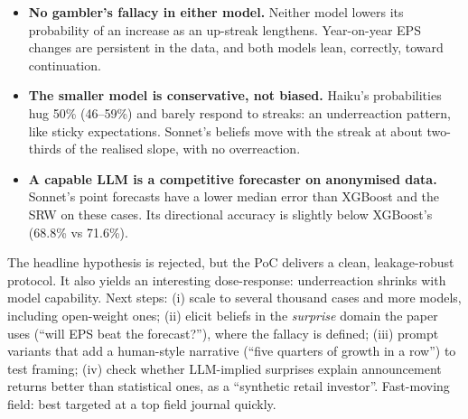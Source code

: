 \begin{itemize}
\item \textbf{No gambler's fallacy in either model.} Neither model lowers its probability of an increase as an
  up-streak lengthens. Year-on-year EPS changes are persistent in the data, and both models lean, correctly, toward
  continuation.
\item \textbf{The smaller model is conservative, not biased.} Haiku's probabilities hug 50\% (46--59\%) and barely
  respond to streaks: an underreaction pattern, like sticky expectations. Sonnet's beliefs move with the streak at
  about two-thirds of the realised slope, with no overreaction.
\item \textbf{A capable LLM is a competitive forecaster on anonymised data.} Sonnet's point forecasts have a lower
  median error than XGBoost and the SRW on these cases. Its directional accuracy is slightly below XGBoost's (68.8\%
  vs 71.6\%).
\end{itemize}

The headline hypothesis is rejected, but the PoC delivers a clean, leakage-robust protocol. It also yields an
interesting dose-response: underreaction shrinks with model capability. Next steps: (i) scale to several thousand
cases and more models, including open-weight ones; (ii) elicit beliefs in the \emph{surprise} domain the paper uses
(``will EPS beat the forecast?''), where the fallacy is defined; (iii) prompt variants that add a human-style
narrative (``five quarters of growth in a row'') to test framing; (iv) check whether LLM-implied surprises explain
announcement returns better than statistical ones, as a ``synthetic retail investor''. Fast-moving field: best
targeted at a top field journal quickly.

